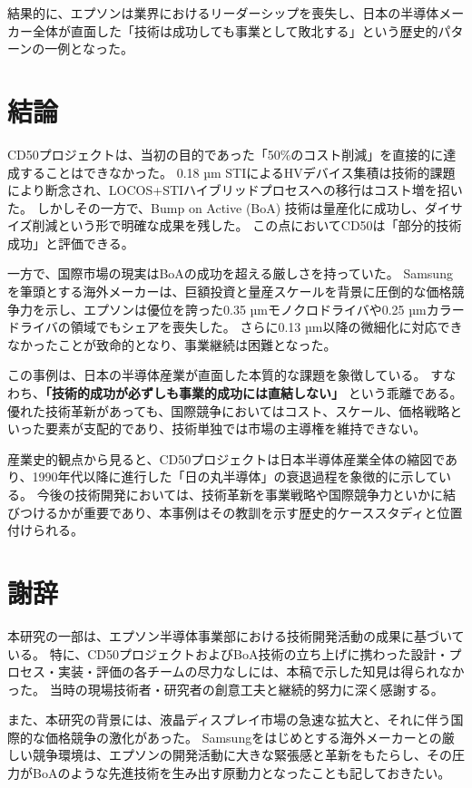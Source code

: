\documentclass[conference]{IEEEtran}
\begin{document}
結果的に、エプソンは業界におけるリーダーシップを喪失し、日本の半導体メーカー全体が直面した「技術は成功しても事業として敗北する」という歴史的パターンの一例となった。

\section{結論}
CD50プロジェクトは、当初の目的であった「50\%のコスト削減」を直接的に達成することはできなかった。  
0.18 µm STIによるHVデバイス集積は技術的課題により断念され、LOCOS+STIハイブリッドプロセスへの移行はコスト増を招いた。  
しかしその一方で、Bump on Active (BoA) 技術は量産化に成功し、ダイサイズ削減という形で明確な成果を残した。  
この点においてCD50は「部分的技術成功」と評価できる。

一方で、国際市場の現実はBoAの成功を超える厳しさを持っていた。  
Samsungを筆頭とする海外メーカーは、巨額投資と量産スケールを背景に圧倒的な価格競争力を示し、エプソンは優位を誇った0.35 µmモノクロドライバや0.25 µmカラードライバの領域でもシェアを喪失した。  
さらに0.13 µm以降の微細化に対応できなかったことが致命的となり、事業継続は困難となった。

この事例は、日本の半導体産業が直面した本質的な課題を象徴している。  
すなわち、\textbf{「技術的成功が必ずしも事業的成功には直結しない」} という乖離である。  
優れた技術革新があっても、国際競争においてはコスト、スケール、価格戦略といった要素が支配的であり、技術単独では市場の主導権を維持できない。  

産業史的観点から見ると、CD50プロジェクトは日本半導体産業全体の縮図であり、1990年代以降に進行した「日の丸半導体」の衰退過程を象徴的に示している。  
今後の技術開発においては、技術革新を事業戦略や国際競争力といかに結びつけるかが重要であり、本事例はその教訓を示す歴史的ケーススタディと位置付けられる。

\section*{謝辞}
本研究の一部は、エプソン半導体事業部における技術開発活動の成果に基づいている。  
特に、CD50プロジェクトおよびBoA技術の立ち上げに携わった設計・プロセス・実装・評価の各チームの尽力なしには、本稿で示した知見は得られなかった。  
当時の現場技術者・研究者の創意工夫と継続的努力に深く感謝する。  

また、本研究の背景には、液晶ディスプレイ市場の急速な拡大と、それに伴う国際的な価格競争の激化があった。  
Samsungをはじめとする海外メーカーとの厳しい競争環境は、エプソンの開発活動に大きな緊張感と革新をもたらし、その圧力がBoAのような先進技術を生み出す原動力となったことも記しておきたい。  
\end{document}
